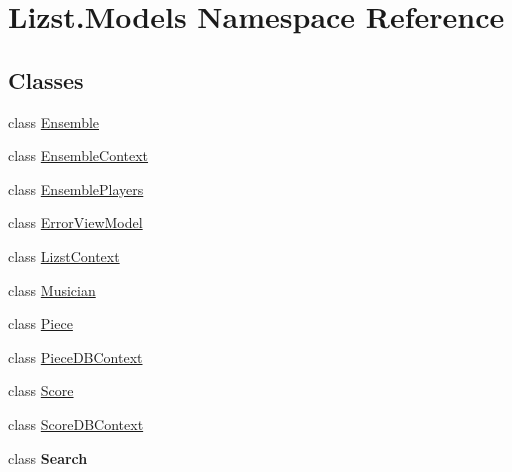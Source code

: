 \hypertarget{namespace_lizst_1_1_models}{}\section{Lizst.\+Models Namespace Reference}
\label{namespace_lizst_1_1_models}
\subsection*{Classes}
\begin{DoxyCompactItemize}
\item 
class \mbox{\hyperlink{class_lizst_1_1_models_1_1_ensemble}{Ensemble}}
\item 
class \mbox{\hyperlink{class_lizst_1_1_models_1_1_ensemble_context}{Ensemble\+Context}}
\item 
class \mbox{\hyperlink{class_lizst_1_1_models_1_1_ensemble_players}{Ensemble\+Players}}
\item 
class \mbox{\hyperlink{class_lizst_1_1_models_1_1_error_view_model}{Error\+View\+Model}}
\item 
class \mbox{\hyperlink{class_lizst_1_1_models_1_1_lizst_context}{Lizst\+Context}}
\item 
class \mbox{\hyperlink{class_lizst_1_1_models_1_1_musician}{Musician}}
\item 
class \mbox{\hyperlink{class_lizst_1_1_models_1_1_piece}{Piece}}
\item 
class \mbox{\hyperlink{class_lizst_1_1_models_1_1_piece_d_b_context}{Piece\+D\+B\+Context}}
\item 
class \mbox{\hyperlink{class_lizst_1_1_models_1_1_score}{Score}}
\item 
class \mbox{\hyperlink{class_lizst_1_1_models_1_1_score_d_b_context}{Score\+D\+B\+Context}}
\item 
class {\bfseries Search}
\end{DoxyCompactItemize}
